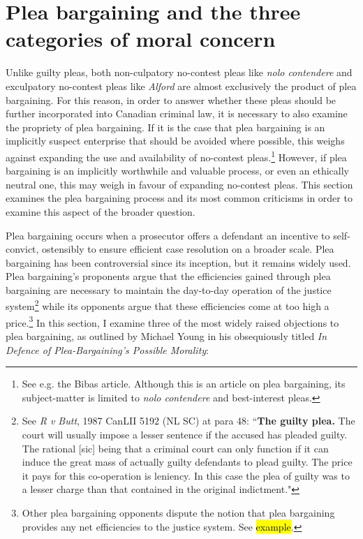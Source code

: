 \section{Plea bargaining and the three categories of moral concern}

Unlike guilty pleas, both non-culpatory no-contest pleas like \textit{nolo contendere} and exculpatory no-contest pleas like \textit{Alford} are almost exclusively the product of plea bargaining. For this reason, in order to answer whether these pleas should be further incorporated into Canadian criminal law, it is necessary to also examine the propriety of plea bargaining. If it is the case that plea bargaining is an implicitly suspect enterprise that should be avoided where possible, this weighs against expanding the use and availability of no-contest pleas.\footnote{See e.g. the Bibas article. Although this is an article on plea bargaining, its subject-matter is limited to \textit{nolo contendere} and best-interest pleas.} However, if plea bargaining is an implicitly worthwhile and valuable process, or even an ethically neutral one, this may weigh in favour of expanding no-contest pleas. This section examines the plea bargaining process and its most common criticisms in order to examine this aspect of the broader question.

Plea bargaining occurs when a prosecutor offers a defendant an incentive to self-convict, ostensibly to ensure efficient case resolution on a broader scale. Plea bargaining has been controversial since its inception, but it remains widely used. Plea bargaining's proponents argue that the efficiencies gained through plea bargaining are necessary to maintain the day-to-day operation of the justice system\footnote{See \textit{R v Butt}, 1987 CanLII 5192 (NL SC) at para 48: ``\textbf{The guilty plea.} The court will usually impose a lesser sentence if the accused has pleaded guilty. The rational [sic] being that a criminal court can only function if it can induce the great mass of actually guilty defendants to plead guilty. The price it pays for this co-operation is leniency. In this case the plea of guilty was to a lesser charge than that contained in the original indictment."} while its opponents argue that these efficiencies come at too high a price.\footnote{Other plea bargaining opponents dispute the notion that plea bargaining provides any net efficiencies to the justice system. See \hl{example}.} In this section, I examine three of the most widely raised objections to plea bargaining, as outlined by Michael Young in his obsequiously titled \textit{In Defence of Plea-Bargaining's Possible Morality}:

